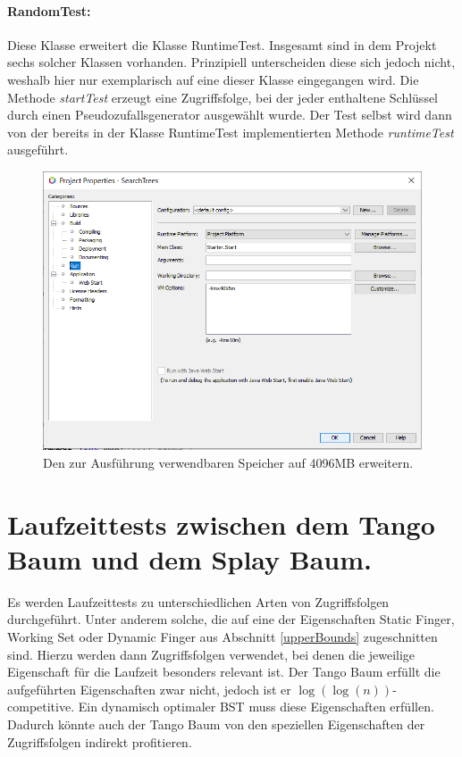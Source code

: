 \documentclass[a4paper,12pt]{article}
\begin{document}
 \paragraph{RandomTest:}
Diese Klasse erweitert die Klasse RuntimeTest. Insgesamt sind in dem Projekt sechs solcher Klassen vorhanden. Prinzipiell unterscheiden diese sich jedoch nicht, weshalb hier nur exemplarisch auf eine dieser Klasse eingegangen wird. Die Methode \textit{startTest} erzeugt eine Zugriffsfolge, bei der jeder enthaltene Schlüssel durch einen Pseudozufallsgenerator ausgewählt wurde. Der Test selbst wird dann von der bereits in der Klasse RuntimeTest implementierten Methode \textit{runtimeTest} ausgeführt. 
 
\begin{figure}[H]
	\centering
	\includegraphics[width=1\textwidth]{Medien/laufzeittest/optionSpeicher}
	\caption{Den zur Ausführung verwendbaren Speicher auf 4096MB erweitern.}
	\label{fig:optionSpeicher}
\end{figure}


\section {Laufzeittests zwischen dem Tango Baum und dem Splay Baum.}

Es werden Laufzeittests zu unterschiedlichen Arten von Zugriffsfolgen durchgeführt. Unter anderem solche, die auf eine der Eigenschaften  Static Finger,  Working Set oder Dynamic Finger aus Abschnitt \ref{upperBounds} zugeschnitten sind. Hierzu werden dann Zugriffsfolgen verwendet, bei denen die jeweilige Eigenschaft für die Laufzeit besonders relevant ist. Der Tango Baum erfüllt die aufgeführten Eigenschaften zwar nicht, jedoch ist er  $\log\left(\log\left(n\right)\right)$-competitive. Ein dynamisch optimaler BST muss diese Eigenschaften erfüllen. Dadurch könnte auch der Tango Baum von den speziellen Eigenschaften der Zugriffsfolgen indirekt profitieren.  \\
\end{document}
